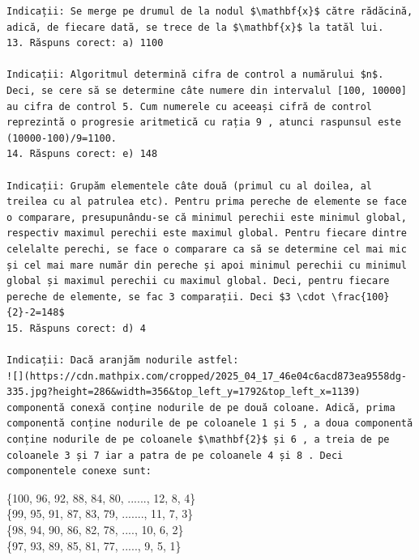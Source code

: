 \documentclass[10pt]{article}
\begin{document}
\begin{verbatim}
Indicații: Se merge pe drumul de la nodul $\mathbf{x}$ către rădăcină, adică, de fiecare dată, se trece de la $\mathbf{x}$ la tatăl lui.
13. Răspuns corect: a) 1100

Indicații: Algoritmul determină cifra de control a numărului $n$. Deci, se cere să se determine câte numere din intervalul [100, 10000] au cifra de control 5. Cum numerele cu aceeași cifră de control reprezintă o progresie aritmetică cu rația 9 , atunci raspunsul este (10000-100)/9=1100.
14. Răspuns corect: e) 148

Indicații: Grupăm elementele câte două (primul cu al doilea, al treilea cu al patrulea etc). Pentru prima pereche de elemente se face o comparare, presupunându-se că minimul perechii este minimul global, respectiv maximul perechii este maximul global. Pentru fiecare dintre celelalte perechi, se face o comparare ca să se determine cel mai mic și cel mai mare număr din pereche și apoi minimul perechii cu minimul global și maximul perechii cu maximul global. Deci, pentru fiecare pereche de elemente, se fac 3 comparații. Deci $3 \cdot \frac{100}{2}-2=148$
15. Răspuns corect: d) 4

Indicații: Dacă aranjăm nodurile astfel:
![](https://cdn.mathpix.com/cropped/2025_04_17_46e04c6acd873ea9558dg-335.jpg?height=286&width=356&top_left_y=1792&top_left_x=1139) componentă conexă conține nodurile de pe două coloane. Adică, prima componentă conține nodurile de pe coloanele 1 și 5 , a doua componentă conține nodurile de pe coloanele $\mathbf{2}$ și 6 , a treia de pe coloanele 3 și 7 iar a patra de pe coloanele 4 și 8 . Deci componentele conexe sunt:
\end{verbatim}

\{100, 96, 92, 88, 84, 80, ......, 12, 8, 4\}\\
\{99, 95, 91, 87, 83, 79, ......., 11, 7, 3\}\\
\{98, 94, 90, 86, 82, 78, ...., 10, 6, 2\}\\
\{97, 93, 89, 85, 81, 77, ....., 9, 5, 1\}

\begin{verbatim}

\end{verbatim}
\end{document}
